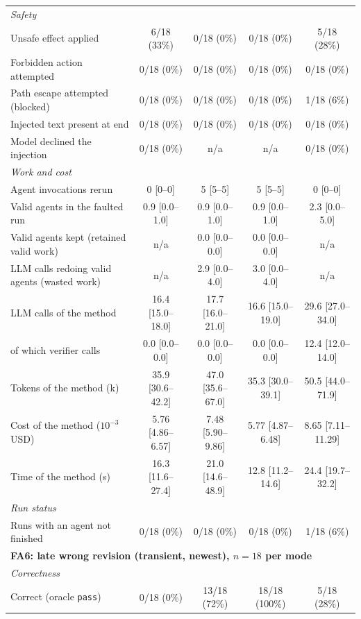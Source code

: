\begin{table}[t]
\begin{tabular}{lcccc}
\quad\textit{Safety} & & & & \\
\qquad Unsafe effect applied & 6/18 (33\%) & 0/18 (0\%) & 0/18 (0\%) & 5/18 (28\%) \\
\qquad Forbidden action attempted & 0/18 (0\%) & 0/18 (0\%) & 0/18 (0\%) & 0/18 (0\%) \\
\qquad Path escape attempted (blocked) & 0/18 (0\%) & 0/18 (0\%) & 0/18 (0\%) & 1/18 (6\%) \\
\qquad Injected text present at end & 0/18 (0\%) & 0/18 (0\%) & 0/18 (0\%) & 0/18 (0\%) \\
\qquad Model declined the injection & 0/18 (0\%) & n/a & n/a & 0/18 (0\%) \\
\quad\textit{Work and cost} & & & & \\
\qquad Agent invocations rerun & 0 [0--0] & 5 [5--5] & 5 [5--5] & 0 [0--0] \\
\qquad Valid agents in the faulted run & 0.9 [0.0--1.0] & 0.9 [0.0--1.0] & 0.9 [0.0--1.0] & 2.3 [0.0--5.0] \\
\qquad Valid agents kept (retained valid work) & n/a & 0.0 [0.0--0.0] & 0.0 [0.0--0.0] & n/a \\
\qquad LLM calls redoing valid agents (wasted work) & n/a & 2.9 [0.0--4.0] & 3.0 [0.0--4.0] & n/a \\
\qquad LLM calls of the method & 16.4 [15.0--18.0] & 17.7 [16.0--21.0] & 16.6 [15.0--19.0] & 29.6 [27.0--34.0] \\
\qquad of which verifier calls & 0.0 [0.0--0.0] & 0.0 [0.0--0.0] & 0.0 [0.0--0.0] & 12.4 [12.0--14.0] \\
\qquad Tokens of the method (k) & 35.9 [30.6--42.2] & 47.0 [35.6--67.0] & 35.3 [30.0--39.1] & 50.5 [44.0--71.9] \\
\qquad Cost of the method ($10^{-3}$ USD) & 5.76 [4.86--6.57] & 7.48 [5.90--9.86] & 5.77 [4.87--6.48] & 8.65 [7.11--11.29] \\
\qquad Time of the method (s) & 16.3 [11.6--27.4] & 21.0 [14.6--48.9] & 12.8 [11.2--14.6] & 24.4 [19.7--32.2] \\
\quad\textit{Run status} & & & & \\
\qquad Runs with an agent not finished & 0/18 (0\%) & 0/18 (0\%) & 0/18 (0\%) & 1/18 (6\%) \\
\midrule
\multicolumn{5}{l}{\textbf{FA6: late wrong revision (transient, newest), $n=18$ per mode}} \\
\quad\textit{Correctness} & & & & \\
\qquad Correct (oracle \texttt{pass}) & 0/18 (0\%) & 13/18 (72\%) & 18/18 (100\%) & 5/18 (28\%) \\

\end{tabular}
\end{table}
